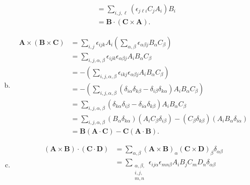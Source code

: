 \documentclass[10pt]{mypackage}
\begin{document}
\begin{enumerate}[(a)]
\begin{align*}
                                                               &= \sum_{i,j,\ell}\left(\epsilon_{j \ell i}C_{j}A_{i}\right)B_i\\
                                                               &= \mathbf{B}\cdot \left(\mathbf{C}\times \mathbf{A}\right).
    \end{align*}
  \item 
    \begin{align*}
      \mathbf{A}\times \left(\mathbf{B}\times \mathbf{C}\right) &= \sum_{i,j}\epsilon_{ijk}A_i\left(\sum_{\alpha,\beta}\epsilon_{\alpha \beta j}B_{\alpha}C_{\beta}\right)\\
                                                                &= \sum_{i,j,\alpha,\beta}\epsilon_{ijk}\epsilon_{\alpha\beta j}A_{i} B_{\alpha}C_{\beta}\\
                                                                &= -\left(\sum_{i,j,\alpha,\beta}\epsilon_{ikj}\epsilon_{\alpha \beta j}A_{i}B_{\alpha}C_{\beta}\right)\\
                                                                &= -\left(\sum_{i,j,\alpha,\beta}\left(\delta_{i\alpha}\delta_{k\beta} - \delta_{i\beta}\delta_{k\alpha}\right)A_{i}B_{\alpha}C_{\beta}\right)\\
                                                                &= \sum_{i,j,\alpha,\beta}\left(\delta_{k\alpha}\delta_{i\beta} - \delta_{i\alpha}\delta_{k\beta}\right)A_iB_{\alpha}C_{\beta}\\
                                                                &= \sum_{i,j,\alpha,\beta}\left(B_{\alpha}\delta_{k\alpha}\right)\left(A_{i}C_{\beta}\delta_{i\beta}\right) - \left(C_{\beta}\delta_{k\beta}\right)\left(A_{i}B_{\alpha}\delta_{i\alpha}\right)\\
                                                                &= \mathbf{B}\left(\mathbf{A}\cdot \mathbf{C}\right) - \mathbf{C}\left(\mathbf{A}\cdot \mathbf{B}\right).
    \end{align*}
  \item 
    \begin{align*}
      \left(\mathbf{A}\times \mathbf{B}\right)\cdot \left(\mathbf{C}\cdot \mathbf{D}\right) &= \sum_{\alpha,\beta}\left(\mathbf{A}\times \mathbf{B}\right)_{\alpha}\left(\mathbf{C}\times \mathbf{D}\right)_{\beta}\delta_{\alpha\beta}\\
                  &= \sum_{\substack{\alpha,\beta,\\i,j,\\m,n}}\epsilon_{ij\alpha}\epsilon_{mn\beta}A_iB_jC_mD_n\delta_{\alpha\beta}\\

\end{align*}
\end{enumerate}
\end{document}
